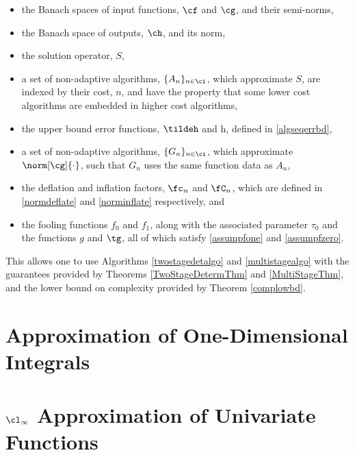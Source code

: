 \documentclass[]{elsarticle}
\theoremstyle{definition}
\theoremstyle{remark}
\begin{document}
\begin{itemize}

\item the Banach spaces of input functions, $\cf$ and $\cg$, and their semi-norms, 

\item the Banach space of outputs, $\ch$, and its norm,

\item the solution operator, $S$,

\item a set of non-adaptive algorithms, $\{A_n\}_{n \in \ci}$, which approximate $S$, are indexed by their cost, $n$, and have the property that some lower cost algorithms are embedded in higher cost algorithms,

\item the upper bound error functions, $\tildeh$ and h, defined in \eqref{algseqerrbd}, 

\item a set of non-adaptive algorithms, $\{G_n\}_{n \in \ci}$, which approximate $\norm[\cg]{\cdot}$, such that $G_n$ uses the same function data as $A_n$,

\item the deflation and inflation factors, $\fc_n$ and $\fC_n$, which are defined in \eqref{normdeflate} and \eqref{norminflate} respectively, and

\item the fooling functions $f_0$ and $f_1$, along with the associated parameter $\tau_0$ and the functions $g$ and $\tg$, all of which satisfy \eqref{assumpfone} and \eqref{assumpfzero}.

\end{itemize}
This allows one to use Algorithms \ref{twostagedetalgo} and \ref{multistagealgo} with the guarantees provided by Theorems \ref{TwoStageDetermThm} and \ref{MultiStageThm}, and the lower bound on complexity provided by Theorem \ref{complowbd}.


\section{Approximation of One-Dimensional Integrals} \label{integsec}



\section{$\cl_{\infty}$ Approximation of Univariate Functions} \label{approxsec}
\end{document}
